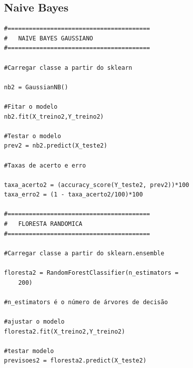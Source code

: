 \documentclass[compress]{beamer}
\begin{document}
\subsection{Naive Bayes}
\begin{verbatim}
#========================================
#   NAIVE BAYES GAUSSIANO
#========================================

#Carregar classe a partir do sklearn

nb2 = GaussianNB()

#Fitar o modelo
nb2.fit(X_treino2,Y_treino2)

#Testar o modelo
prev2 = nb2.predict(X_teste2)

#Taxas de acerto e erro

taxa_acerto2 = (accuracy_score(Y_teste2, prev2))*100
taxa_erro2 = (1 - taxa_acerto2/100)*100

#========================================
#   FLORESTA RANDOMICA
#========================================

#Carregar classe a partir do sklearn.ensemble

floresta2 = RandomForestClassifier(n_estimators =
    200)

#n_estimators é o número de árvores de decisão

#ajustar o modelo
floresta2.fit(X_treino2,Y_treino2)

#testar modelo
previsoes2 = floresta2.predict(X_teste2)


\end{verbatim}
\end{document}
